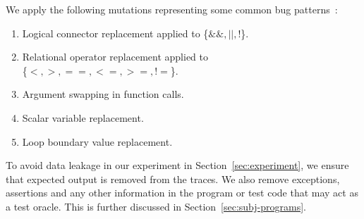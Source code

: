 We apply the following mutations representing some common bug patterns~\cite{jia2011analysis, pradel2018deepbugs}: %
\begin{enumerate}[itemsep = 0pt, topsep = 0pt, partopsep=0pt]
	\item Logical connector replacement applied to \{$\&\&, ||, !$\}.
	\item Relational operator replacement applied to \\ \{$<, > , ==, <=, >=, !=$\}.
	\item Argument swapping in function calls.
	\item Scalar variable replacement.
	\item Loop boundary value replacement.
\end{enumerate}
\fi
To avoid data leakage in our experiment in Section~\ref{sec:experiment}, we ensure that expected output is removed from the traces. We also remove exceptions, assertions and any other information in the program or test code that may act as a test oracle. This is further discussed in Section~\ref{sec:subj-programs}. %
%
%

